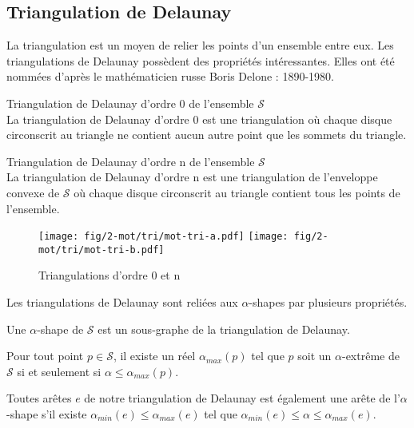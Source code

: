 \subsection{Triangulation de Delaunay}

La triangulation est un moyen de relier les points d'un ensemble entre eux. Les triangulations de Delaunay possèdent des propriétés intéressantes.  Elles ont été nommées d'après le mathématicien russe Boris Delone : 1890-1980.

\begin{Definition}{Triangulation de Delaunay d'ordre 0 de l'ensemble $\mathcal{S}$}\\
\label{def:tri-del-0}
  La triangulation de Delaunay d'ordre 0 est une triangulation où chaque disque circonscrit au triangle ne contient aucun autre point que les sommets du triangle.
\end{Definition}

\begin{Definition}{Triangulation de Delaunay d'ordre n de l'ensemble $\mathcal{S}$}\\
\label{def:tri-del-n}
  La triangulation de Delaunay d'ordre n est une triangulation de l'enveloppe convexe de $\mathcal{S}$ où chaque disque circonscrit au triangle contient tous les points de l'ensemble.
\end{Definition}

\begin{figure}[H]
  \centering
  \texttt{[image: fig/2-mot/tri/mot-tri-a.pdf]}
  \texttt{[image: fig/2-mot/tri/mot-tri-b.pdf]}
  \caption{Triangulations d'ordre 0 et n}
\end{figure}


Les triangulations de Delaunay sont reliées aux $\alpha$-shapes par plusieurs propriétés. \cite{EdeKirSei83}

\begin{Lemma}
  Une $\alpha$-shape de $\mathcal{S}$ est un sous-graphe de la triangulation de Delaunay.
\end{Lemma}

\begin{Lemma}
  Pour tout point $p \in \mathcal{S}$, il existe un réel $\alpha_{max}(p)$ tel que $p$ soit un $\alpha$-extrême de $\mathcal{S}$ si et seulement si $\alpha \leq \alpha_{max}(p)$.
\end{Lemma}

\begin{Lemma}
  Toutes arêtes $e$ de notre triangulation de Delaunay est également une arête de l'$\alpha$-shape s'il existe $\alpha_{min}(e) \leq \alpha_{max}(e)$ tel que $\alpha_{min}(e) \leq \alpha \leq \alpha_{max}(e)$.
\end{Lemma}
